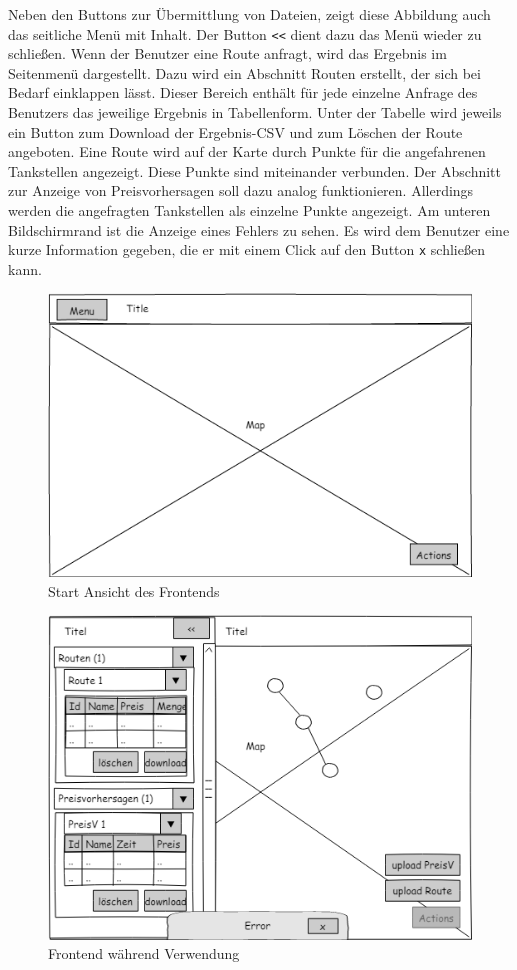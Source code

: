 \documentclass[
ngerman          %
,a4paper          %
,11pt
,pdftex
]{report}
\begin{document}
Neben den Buttons zur Übermittlung von Dateien, zeigt diese Abbildung auch das seitliche Menü mit Inhalt. Der Button \texttt{<<} dient dazu das Menü wieder zu schließen. Wenn der Benutzer eine Route anfragt, wird das Ergebnis im Seitenmenü dargestellt. Dazu wird ein Abschnitt Routen erstellt, der sich bei Bedarf einklappen lässt. Dieser Bereich enthält für jede einzelne Anfrage des Benutzers das jeweilige Ergebnis in Tabellenform. Unter der Tabelle wird jeweils ein Button zum Download der Ergebnis-\ac{CSV} und zum Löschen der Route angeboten. Eine Route wird auf der Karte durch Punkte für die angefahrenen Tankstellen angezeigt. Diese Punkte sind miteinander verbunden. Der Abschnitt zur Anzeige von Preisvorhersagen soll dazu analog funktionieren. Allerdings werden die angefragten Tankstellen als einzelne Punkte angezeigt. Am unteren Bildschirmrand ist die Anzeige eines Fehlers zu sehen. Es wird dem Benutzer eine kurze Information gegeben, die er mit einem Click auf den Button \texttt{x} schließen kann.

\begin{figure}
\centering
\includegraphics[width=0.7\linewidth]{startview.png}
\caption{Start Ansicht des Frontends}
\label{fig:startview}
\end{figure}

\begin{figure}
\centering
\includegraphics[width=0.7\linewidth]{draweropen.png}
\caption{Frontend während Verwendung}
\label{fig:draweropen}
\end{figure}
\end{document}
